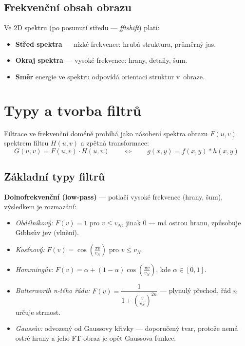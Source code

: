 \subsection*{Frekvenční obsah obrazu}
 
Ve 2D spektru (po posunutí středu — \emph{fftshift}) platí:
\begin{itemize}
  \item \textbf{Střed spektra} — nízké frekvence: hrubá struktura, průměrný jas.
  \item \textbf{Okraj spektra} — vysoké frekvence: hrany, detaily, šum.
  \item \textbf{Směr} energie ve spektru odpovídá orientaci struktur v~obraze.
\end{itemize}
 
\section*{Typy a tvorba filtrů}
 
Filtrace ve frekvenční doméně probíhá jako násobení spektra obrazu $F(u,v)$ spektrem filtru $H(u,v)$ a zpětná transformace:
\[
  G(u,v) = F(u,v) \cdot H(u,v)
  \qquad\Leftrightarrow\qquad
  g(x,y) = f(x,y) * h(x,y)
\]
 
\subsection*{Základní typy filtrů}
 
\textbf{Dolnofrekvenční (low-pass)} — potlačí vysoké frekvence (hrany, šum), výsledkem je rozmazání:
\begin{itemize}
  \item \emph{Obdélníkový:} $F(v) = 1$ pro $v \le v_N$, jinak $0$ — má ostrou hranu, způsobuje Gibbsův jev (vlnění).
  \item \emph{Kosínový:} $F(v) = \cos\!\left(\frac{\pi v}{v_N}\right)$ pro $v \le v_N$.
  \item \emph{Hammingův:} $F(v) = \alpha + (1-\alpha)\cos\!\left(\frac{\pi v}{v_N}\right)$, kde $\alpha \in [0,1]$.
  \item \emph{Butterworth n-tého řádu:} $F(v) = \dfrac{1}{1 + \left(\frac{v}{v_N}\right)^{2n}}$ — plynulý přechod, řád $n$ určuje strmost.
  \item \emph{Gaussův:} odvozený od Gaussovy křivky — doporučený tvar, protože nemá ostré hrany a jeho FT obraz je opět Gaussova funkce.
\end{itemize}
 
